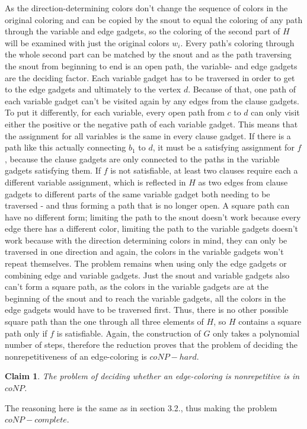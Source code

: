 \documentclass[12pt,a4paper]{article}
\newtheorem{claim}{Claim}
\begin{document}
As the direction-determining colors don't change the sequence of colors in the original coloring and can be copied by the snout to equal the coloring of any path through the variable and edge gadgets, so the coloring of the second part of $H$ will be examined with just the original colors $w_i$. Every path's coloring through the whole second part can be matched by the snout and as the path traversing the snout from beginning to end is an open path, the variable- and edge gadgets are the deciding factor. Each variable gadget has to be traversed in order to get to the edge gadgets and ultimately to the vertex $d$. Because of that, one path of each variable gadget can't be visited again by any edges from the clause gadgets. To put it differently, for each variable, every open path from $c$ to $d$ can only visit either the positive or the negative path of each variable gadget. This means that the assignment for all variables is the same in every clause gadget. If there is a path like this actually connecting $b_1$ to $d$, it must be a satisfying assignment for $f$, because the clause gadgets are only connected to the paths in the variable gadgets satisfying them. If $f$ is not satisfiable, at least two clauses require each a different variable assignment, which is  reflected in $H$ as two edges from clause gadgets to different parts of the same variable gadget both needing to be traversed - and thus forming a path that is no longer open. A square path can have no different form; limiting the path to the snout doesn't work because every edge there has a different color, limiting the path to the variable gadgets doesn't work because with the direction determining colors in mind, they can only be traversed in one direction and again, the colors in the variable gadgets won't repeat themselves. The problem remains when using only the edge gadgets or combining edge and variable gadgets. Just the snout and variable gadgets also can't form a square path, as the colors in the variable gadgets are at the beginning of the snout and to reach the variable gadgets, all the colors in the edge gadgets would have to be traversed first. Thus, there is no other possible square path than the one through all three elements of $H$, so $H$ contains a square path only if $f$ is satisfiable.
\newline
Again, the construction of $G$ only takes a polynomial number of steps, therefore the reduction proves that the problem of deciding the nonrepetitiveness of an edge-coloring is $coNP-hard$. 
\begin{claim}
The problem of deciding whether an edge-coloring is nonrepetitive is in $coNP$.
\end{claim}
The reasoning here is the same as in section 3.2., thus making the problem $coNP-complete$.
\newpage
\end{document}
